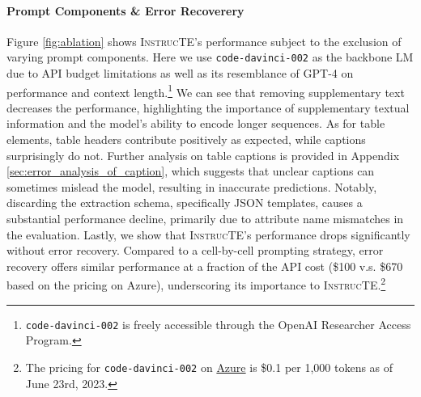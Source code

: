 \documentclass[11pt]{article}
\newcommand\method{\textsc{InstrucTE}}
\begin{document}
\paragraph{Prompt Components \& Error Recoverery}
Figure \ref{fig:ablation} shows \method{}'s performance subject to the exclusion of varying prompt components. Here we use \texttt{code-davinci-002} as the backbone LM due to API budget limitations as well as its resemblance of GPT-4 on performance and context length.\footnote{\texttt{code-davinci-002} is freely accessible through the OpenAI Researcher Access Program.}
We can see that removing supplementary text decreases the performance, highlighting the importance of supplementary textual information and the model's ability to encode longer sequences.  As for table elements, table headers contribute positively as expected, while captions surprisingly do not. Further analysis on table captions is provided in Appendix \ref{sec:error_analysis_of_caption}, which suggests that unclear captions can sometimes mislead the model, resulting in inaccurate predictions.
Notably, discarding the extraction schema, specifically JSON templates, causes a substantial performance decline, primarily due to attribute name mismatches in the evaluation.
Lastly, we show that \method{}'s performance drops significantly without error recovery. 
Compared to a cell-by-cell prompting strategy, error recovery offers similar performance at a fraction of the API cost (\$100 v.s. \$670 based on the pricing on Azure), underscoring its importance to \method{}.\footnote{The pricing for \texttt{code-davinci-002} on \href{https://azure.microsoft.com/en-us/pricing/details/cognitive-services/openai-service/}{Azure} is \$0.1 per 1,000 tokens as of June 23rd, 2023.} 
\end{document}
